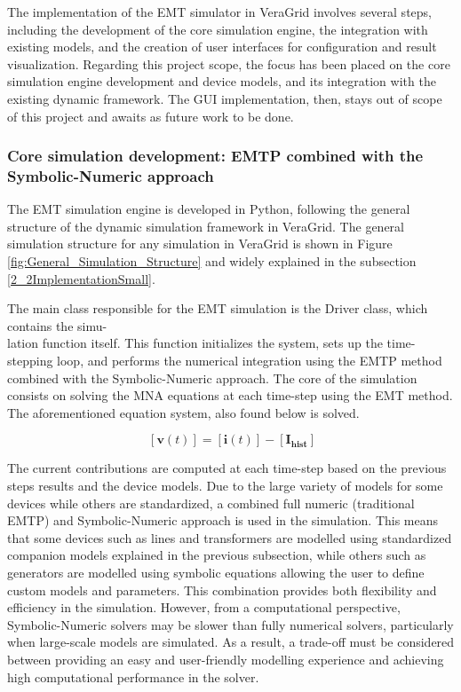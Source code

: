 The implementation of the EMT simulator in VeraGrid involves several steps, including the development of the core simulation engine,
the integration with existing  models, and the creation of user interfaces for configuration and result visualization. Regarding
this project scope, the focus has been placed on the core simulation engine development and device models, and its integration with the existing
dynamic framework. The GUI implementation, then, stays out of scope of this project and awaits as future work to be done.

\subsubsection*{Core simulation development: EMTP combined with the Symbolic-Numeric approach}

The EMT simulation engine is developed in Python, following the general structure of the dynamic simulation framework in VeraGrid. The general simulation structure for any simulation in VeraGrid
 is shown in Figure \ref{fig:General_Simulation_Structure} and widely explained in the subsection \ref{2_2ImplementationSmall}. 

The main class responsible for the EMT simulation is the Driver class, which contains the simu-\\lation function itself. 
This function initializes the system, sets up the time-stepping loop, and performs the numerical integration using the EMTP method combined with the Symbolic-Numeric approach.
The core of the simulation consists on solving the MNA equations at each time-step using the EMT method. The aforementioned equation system, also found below is solved.

\begin{equation}
    [\bm{G}]~[\bm{v}(t)] = [\bm{i}(t)]-[\bm{I_{\text{hist}}}]
\end{equation}

The current contributions are computed at each time-step based on the previous steps results and the device models. 
Due to the large variety of models for some devices while others are standardized, a combined full numeric (traditional EMTP) and
Symbolic-Numeric approach is used in the simulation. This means that some devices such as lines and transformers are modelled using
standardized companion models explained in the previous subsection, while others such as generators are modelled using symbolic equations allowing the user
to define custom models and parameters. This combination provides both flexibility and efficiency in the simulation. However, from a computational perspective,
 Symbolic-Numeric solvers may be slower than fully numerical solvers, particularly when large-scale models are simulated.
  As a result, a trade-off must be considered between providing an easy and user-friendly modelling experience and achieving high computational performance in the solver.

